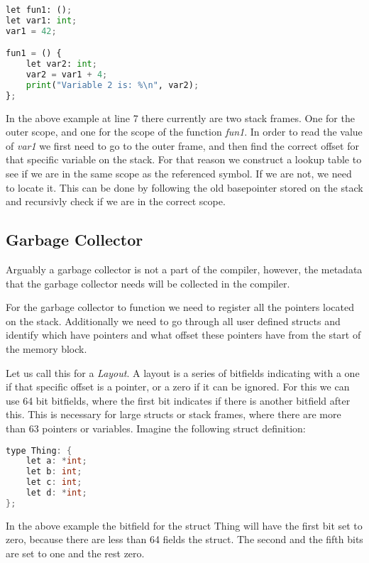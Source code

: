 \begin{lstlisting}[language=Python,title=Static Scoping]
let fun1: ();
let var1: int;
var1 = 42;

fun1 = () {
    let var2: int;
    var2 = var1 + 4;
    print("Variable 2 is: %\n", var2);
};
\end{lstlisting}

In the above example at line 7 there currently are two stack frames. One for the outer scope, and one for the scope of the function \textit{fun1}. In order to read the value of \textit{var1} we first need to go to the outer frame, and then find the correct offset for that specific variable on the stack. For that reason we construct a lookup table to see if we are in the same scope as the referenced symbol. If we are not, we need to locate it. This can be done by following the old basepointer stored on the stack and recursivly check if we are in the correct scope.  


\subsection{Garbage Collector}
Arguably a garbage collector is not a part of the compiler, however, the metadata that the garbage collector needs will be collected in the compiler.


For the garbage collector to function we need to register all the pointers located on the stack. Additionally we need to go through all user defined structs and identify which have pointers and what offset these pointers have from the start of the memory block. 

Let us call this for a \textit{Layout}. A layout is a series of bitfields indicating with a one if that specific offset is a pointer, or a zero if it can be ignored. For this we can use 64 bit bitfields, where the first bit indicates if there is another bitfield after this. This is necessary for large structs or stack frames, where there are more than 63 pointers or variables. Imagine the following struct definition:

\begin{lstlisting}[language=C,keywords={Thing, int},title=Type Definition]
type Thing: {
    let a: *int;
    let b: int;
    let c: int;
    let d: *int;
};
\end{lstlisting}

In the above example the bitfield for the struct Thing will have the first bit set to zero, because there are less than 64 fields the struct. The second and the fifth bits are set to one and the rest zero. 


